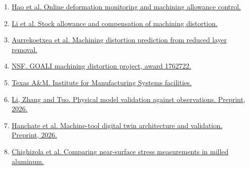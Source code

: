 \documentclass[11pt,letterpaper]{article}
\begin{document}
\begin{enumerate}
\small\setlength{\itemsep}{0pt}
\item \href{https://doi.org/10.1016/j.cja.2020.03.038}{Hao et al. Online deformation monitoring and machining allowance control.}
\item \href{https://doi.org/10.1016/j.cirp.2015.04.025}{Li et al. Stock allowance and compensation of machining distortion.}
\item \href{https://doi.org/10.3390/jmmp8010009}{Aurrekoetxea et al. Machining distortion prediction from reduced layer removal.}
\item \href{https://www.nsf.gov/awardsearch/showAward?AWD_ID=1762722}{NSF. GOALI machining distortion project, award 1762722.}
\item \href{https://texasmakes.tamu.edu/facilities/}{Texas A\&M. Institute for Manufacturing Systems facilities.}
\item \href{https://arxiv.org/abs/2604.17144}{Li, Zhang and Tuo. Physical model validation against observations. Preprint, 2026.}
\item \href{https://ssrn.com/abstract=7243783}{Hanchate et al. Machine-tool digital twin architecture and validation. Preprint, 2026.}
\item \href{https://doi.org/10.1007/s11340-021-00734-5}{Chighizola et al. Comparing near-surface stress measurements in milled aluminum.}
\end{enumerate}
\end{document}
